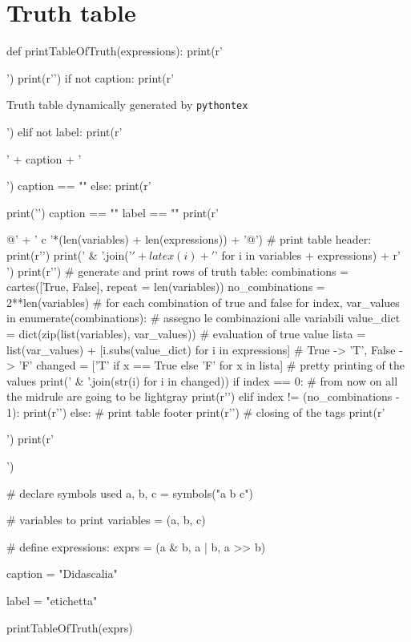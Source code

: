 \documentclass[a4paper]{article}
\begin{document}
\section{Truth table}

\begin{sympycode}
def printTableOfTruth(expressions):
	print(r'\begin{table}[htbp]')
	print(r'\centering')
	if not caption:
		print(r'\caption{Truth table dynamically generated by \texttt{pythontex}}')
	elif not label:
		print(r'\caption{' + caption + '}')
		caption == ""
	else:
		print(r'\caption{' + caption + '}%
		print('\label{tab:' + label + '}')
		caption == ""
		label == ""
	print(r'\begin{tabular}{@{}' + ' c '*(len(variables) + len(expressions)) + '@{}}')
	# print table header:
	print(r'\toprule')
	print(' & '.join('\(' + latex(i) + '\)' for i in variables + expressions) + r' \tabularnewline')
	print(r'\midrule')
	# generate and print rows of truth table:
	combinations = cartes([True, False], repeat = len(variables))
	no_combinations = 2**len(variables)
	# for each combination of true and false
	for index, var_values in enumerate(combinations):
		# assegno le combinazioni alle variabili
		value_dict = dict(zip(list(variables), var_values))
		# evaluation of true value
		lista = list(var_values) + [i.subs(value_dict) for i in expressions]
		# True -> 'T', False -> 'F'
		changed = ['T' if x == True else 'F' for x in lista]
		# pretty printing of the values
		print(' & '.join(str(i) for i in changed))
		if index == 0:
			# from now on all the midrule are going to be lightgray
			print(r'\tabularnewline{}\midrule')
		elif index != (no_combinations - 1):
			print(r'\tabularnewline\midrule')
		else:
			# print table footer
			print(r'\tabularnewline{}\bottomrule')
	# closing of the tags
	print(r'\end{tabular}')
	print(r'\end{table}')
\end{sympycode}

\begin{sympycode}
# declare symbols used
a, b, c = symbols("a b c")

# variables to print
variables = (a, b, c)

# define expressions:
exprs = (a & b, a | b, a >> b)

caption = "Didascalia"

label = "etichetta"

printTableOfTruth(exprs)
\end{sympycode}
\end{document}
